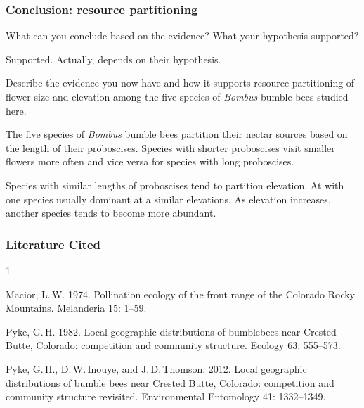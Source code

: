 \documentclass[12pt, hidelinks, twoside]{exam}
\newcommand*\AnswerBox[2]{%
    \parbox[t][#1]{0.92\textwidth}{%
    \begin{solution}#2\end{solution}}
    \vspace{\stretch{1}}
}
\newenvironment{AnswerPage}[1]
    {\begin{minipage}[t][#1]{0.92\textwidth}%
    \begin{solution}}
    {\end{solution}\end{minipage}
    \vspace{\stretch{1}}}
\begin{document}
\begin{questions}
\subsubsection*{Conclusion: resource partitioning}

\question[Checkout]
What can you conclude based on the evidence? What your hypothesis supported?

\AnswerBox{0.05\textheight}{Supported. Actually, depends on their hypothesis.}

\question[Checkout]
Describe the evidence you now have and how it supports resource partitioning of flower size and elevation among the five species of 
\textit{Bombus} bumble bees studied here.


\begin{AnswerPage}{0.2\textheight}
The five species of \textit{Bombus} bumble bees partition their
nectar sources based on the length of their proboscises. Species
with shorter proboscises visit smaller flowers more often and 
vice versa for species with long proboscises.

Species with similar lengths of proboscises tend to partition
elevation. At with one species usually dominant at a similar 
elevations. As elevation increases, another species tends to become
more abundant.
\end{AnswerPage}


\end{questions}


\subsubsection*{Literature Cited}

\begin{hangparas}{\leftmargin}{1}

Macior, L.\,W. 1974. Pollination ecology of the front
range of the Colorado Rocky Mountains. Melanderia 15: 1–59.

Pyke, G.\,H. 1982. Local geographic distributions of bumblebees 
near Crested Butte, Colorado: competition and community structure.
Ecology 63: 555–573.

Pyke, G.\,H., D.\,W.\,Inouye, and J.\,D.\,Thomson. 2012. Local geographic distributions of bumble bees near Crested Butte, Colorado: competition and community structure revisited. Environmental Entomology 41: 1332–1349.

\end{hangparas}
\end{document}
